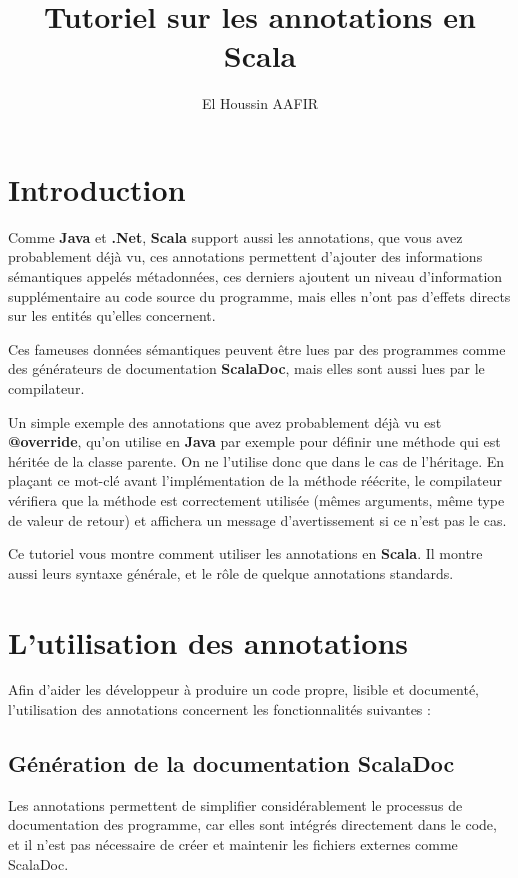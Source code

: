 \documentclass[runningheads]{llncs}
\title{Tutoriel sur les annotations en Scala}
\author{El Houssin AAFIR\orcidID{EID2} }
\institute{Université Paris 13}
\begin{document}
%
\maketitle              %
%


\section{Introduction}
Comme \textbf{Java} et \textbf{.Net}, \textbf{Scala} support aussi les annotations, que vous avez probablement déjà vu, ces annotations permettent d'ajouter des informations sémantiques appelés métadonnées, ces derniers ajoutent un niveau d'information supplémentaire au code source du programme, mais elles n'ont pas d'effets directs sur les entités qu'elles concernent.\newline

Ces fameuses données sémantiques peuvent être lues par des programmes comme des générateurs de documentation \textbf{ScalaDoc}, mais elles sont aussi lues par le compilateur.\newline

Un simple exemple des annotations que avez probablement déjà vu est \textbf{@override}, qu’on utilise en \textbf{Java} par exemple pour définir une méthode qui est héritée de la classe parente. On ne l'utilise donc que dans le cas de l'héritage. En plaçant ce mot-clé avant l’implémentation de la méthode réécrite, le compilateur vérifiera que la méthode est correctement utilisée (mêmes arguments, même type de valeur de retour) et affichera un message d'avertissement si ce n'est pas le cas.\newline

Ce tutoriel vous montre comment utiliser les annotations en \textbf{Scala}. Il montre aussi leurs syntaxe générale, et le rôle de quelque annotations standards.
\section{L’utilisation des annotations}
Afin d’aider les développeur à produire un code propre, lisible et documenté, l’utilisation des annotations concernent les fonctionnalités suivantes :
\subsection{Génération de la documentation ScalaDoc}
Les annotations permettent de simplifier considérablement le processus de documentation des programme, car elles sont intégrés directement dans le code, et il n'est pas nécessaire de créer et maintenir les fichiers externes comme ScalaDoc. 
\end{document}

